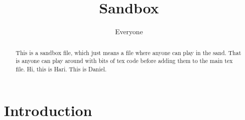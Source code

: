 \documentclass{article}
\title{Sandbox}
\author{Everyone}
\begin{document}
\maketitle

\begin{abstract}
    This is a sandbox file, which just means a file where anyone can
    play in the sand. That is anyone can play around with bits of tex
    code before adding them to the main tex file. Hi, this is
    Hari. This is Daniel.
\end{abstract}

\section{Introduction}
\end{document}
